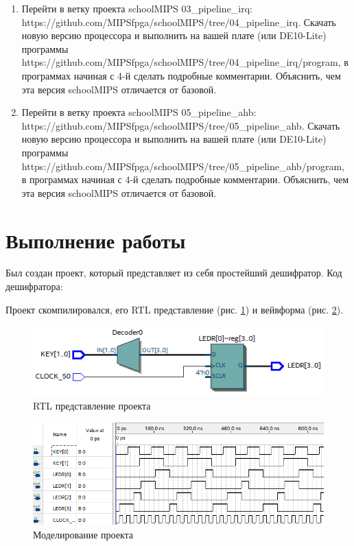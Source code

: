 \documentclass[a4paper,14pt]{article}
\begin{document}
\begin{enumerate}
		\item Перейти в ветку проекта schoolMIPS 03\_pipeline\_irq: https://github.com/MIPSfpga/schoolMIPS/tree/04\_pipeline\_irq.
		Скачать новую версию процессора и выполнить на вашей плате (или DE10-Lite) программы https://github.com/MIPSfpga/schoolMIPS/tree/04\_pipeline\_irq/program, в программах начиная с 4-й сделать подробные комментарии. Объяснить, чем эта версия schoolMIPS отличается от базовой.
		
		\item Перейти в ветку проекта schoolMIPS 05\_pipeline\_ahb: https://github.com/MIPSfpga/schoolMIPS/tree/05\_pipeline\_ahb.
		Скачать новую версию процессора и выполнить на вашей плате (или DE10-Lite) программы https://github.com/MIPSfpga/schoolMIPS/tree/05\_pipeline\_ahb/program, в программах начиная с 4-й сделать подробные комментарии. Объяснить, чем эта версия schoolMIPS отличается от базовой.
		
	\end{enumerate}

	
	\section{Выполнение работы}
	
	Был создан проект, который представляет из себя простейший дешифратор.
	Код дешифратора:
	
	{\small {}}
	
	Проект скомпилировался, его RTL представление (рис. \ref{fig:rtl}) и вейвформа (рис. \ref{fig:wvf}).
	
	\begin{figure}[H]
		\centering
		\includegraphics[width=0.6\linewidth]{images/RTL}
		\caption{RTL представление проекта}
		\label{fig:rtl}
	\end{figure}

	\begin{figure}[H]
		\centering
		\includegraphics[width=0.6\linewidth]{images/WVF}
		\caption{Моделирование проекта}
		\label{fig:wvf}
	\end{figure}
	
\end{document}
